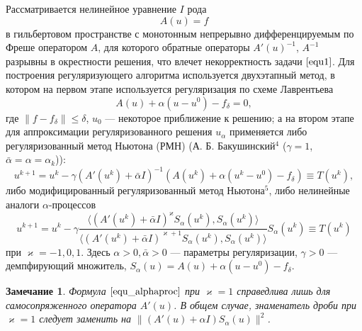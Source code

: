 \documentclass[%
autoref,     %
href,        %
facsimile,   %
colorlinks,  %
]{disser}
\newtheorem{remark}{Замечание}
\begin{document}
Рассматривается нелинейное уравнение $I$ рода
\begin{equation}\label{equ1}A(u)=f\end{equation}
в гильбертовом пространстве с монотонным непрерывно дифференцируемым по Фреше оператором $A$, для которого обратные операторы $A'(u)^{-1}$, $A^{-1}$ разрывны в окрестности решения, что влечет некорректность задачи $\eqref{equ1}$. Для построения регуляризующего алгоритма используется двухэтапный метод, в котором на первом этапе используется регуляризация по схеме Лаврентьева
\begin{equation}\label{equ2}A(u)+\alpha(u-u^0)-f_\delta=0,\end{equation}
где $\|f-f_\delta\|\leqslant\delta$, $u_0$ --- некоторое приближение к решению; а на втором этапе для аппроксимации регуляризованного решения $u_\alpha$ применяется либо регуляризованный метод Ньютона (РМН) (А. Б. Бакушинский$^4$ ($\gamma=1$, $\bar{\alpha}=\alpha=\alpha_k$)):
\begin{equation}\label{equ_rmn}
u^{k+1}=u^k-\gamma(A'(u^k)+\bar\alpha I)^{-1}(A(u^k)+\alpha(u^k-u^0)-f_\delta)\equiv{T(u^k)},
\end{equation}
либо модифицированный регуляризованный метод Ньютона$^5$,
{\scriptsize
	\let\thefootnote\relax\let\thefootnote\relax{}
	\let\thefootnote\relax\let\thefootnote\relax{}}
либо нелинейные аналоги $\alpha$-процессов
\begin{equation}\label{equ_alphaproc}
u^{k+1}=u^k-\gamma\frac{\langle (A'(u^k)+\bar\alpha I)^{\varkappa}S_\alpha(u^k), S_\alpha(u^k)\rangle }{\langle(A'(u^k)+\bar\alpha I)^{\varkappa+1}S_\alpha(u^k), S_\alpha(u^k)\rangle }S_\alpha(u^k)\equiv{T(u^k)}
\end{equation}
при $\varkappa=-1,0,1$. Здесь $\alpha>0, \bar\alpha>0$ --- параметры регуляризации, $\gamma>0$ --- демпфирующий множитель, $S_\alpha(u)=A(u)+\alpha(u-u^0)-f_\delta$.
\begin{remark}
	Формула $\eqref{equ_alphaproc}$ при $\varkappa=1$ справедлива лишь для самосопряженного оператора $A'(u)$. В общем случае, знаменатель дроби при $\varkappa=1$ следует заменить на $\|(A'(u)+\alpha I)S_\alpha (u)\|^2$.
\end{remark}
\end{document}

